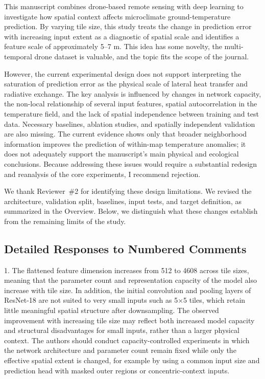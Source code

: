 \documentclass[12pt,english]{reviewresponse}
\begin{document}
\begin{generalcomment}
This manuscript combines drone-based remote sensing with deep learning to investigate how spatial context affects microclimate ground-temperature prediction. By varying tile size, this study treats the change in prediction error with increasing input extent as a diagnostic of spatial scale and identifies a feature scale of approximately 5–7 m. This idea has some novelty, the multi-temporal drone dataset is valuable, and the topic fits the scope of the journal.

However, the current experimental design does not support interpreting the saturation of prediction error as the physical scale of lateral heat transfer and radiative exchange. The key analysis is influenced by changes in network capacity, the non-local relationship of several input features, spatial autocorrelation in the temperature field, and the lack of spatial independence between training and test data. Necessary baselines, ablation studies, and spatially independent validation are also missing. The current evidence shows only that broader neighborhood information improves the prediction of within-map temperature anomalies; it does not adequately support the manuscript's main physical and ecological conclusions. Because addressing these issues would require a substantial redesign and reanalysis of the core experiments, I recommend rejection.
\end{generalcomment}

\begin{revresponse}
We thank Reviewer~\#2 for identifying these design limitations. We revised the architecture, validation split, baselines, input tests, and target definition, as summarized in the Overview. Below, we distinguish what these changes establish from the remaining limits of the study.
\end{revresponse}

\subsection*{Detailed Responses to Numbered Comments}

\begin{revcomment}
1. The flattened feature dimension increases from 512 to 4608 across tile sizes, meaning that the parameter count and representation capacity of the model also increase with tile size. In addition, the initial convolution and pooling layers of ResNet-18 are not suited to very small inputs such as 5×5 tiles, which retain little meaningful spatial structure after downsampling. The observed improvement with increasing tile size may reflect both increased model capacity and structural disadvantages for small inputs, rather than a larger physical context. The authors should conduct capacity-controlled experiments in which the network architecture and parameter count remain fixed while only the effective spatial extent is changed, for example by using a common input size and prediction head with masked outer regions or concentric-context inputs.
\end{revcomment}
\end{document}

